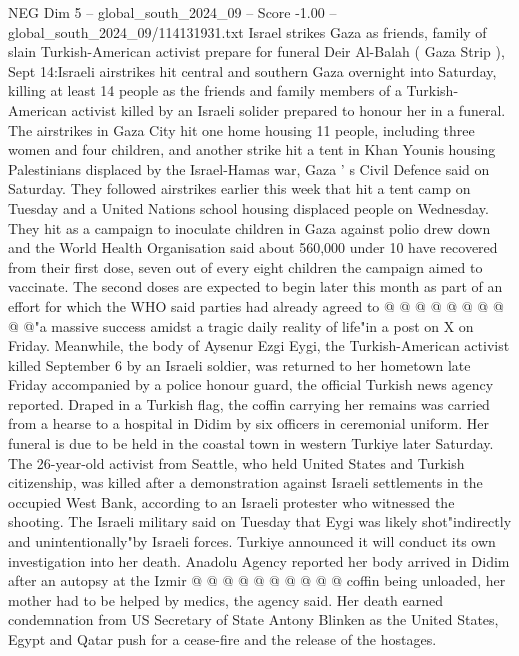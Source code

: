 \begin{textsample}{NEG Dim 5 – global\_south\_2024\_09 – Score -1.00 – global\_south\_2024\_09/114131931.txt}  \label{ex:f5_neg_194}
Israel strikes Gaza as friends, family of slain Turkish-American activist prepare for funeral Deir Al-Balah ( Gaza Strip ), Sept 14:Israeli airstrikes hit central and southern Gaza overnight into Saturday, killing at least 14 people as the friends and family members of a Turkish-American activist killed by an Israeli solider prepared to honour her in a funeral.
The airstrikes in Gaza City hit one home housing 11 people, including three women and four children, and another strike hit a tent in Khan Younis housing Palestinians displaced by the Israel-Hamas war, Gaza ' s Civil Defence said on Saturday.
They followed airstrikes earlier this week that hit a tent camp on Tuesday and a United Nations school housing displaced people on Wednesday.
They hit as a campaign to inoculate children in Gaza against polio drew down and the World Health Organisation said about 560,000 under 10 have recovered from their first dose, seven out of every eight children the campaign aimed to vaccinate.
The second doses are expected to begin later this month as part of an effort for which the WHO said parties had already agreed to @ @ @ @ @ @ @ @ @ @"a massive success amidst a tragic daily reality of life"in a post on X on Friday.
Meanwhile, the body of Aysenur Ezgi Eygi, the Turkish-American activist killed September 6 by an Israeli soldier, was returned to her hometown late Friday accompanied by a police honour guard, the official Turkish news agency reported.
Draped in a Turkish flag, the coffin carrying her remains was carried from a hearse to a hospital in Didim by six officers in ceremonial uniform.
Her funeral is due to be held in the coastal town in western Turkiye later Saturday.
The 26-year-old activist from Seattle, who held United States and Turkish citizenship, was killed after a demonstration against Israeli settlements in the occupied West Bank, according to an Israeli protester who witnessed the shooting.
The Israeli military said on Tuesday that Eygi was likely shot"indirectly and unintentionally"by Israeli forces.
Turkiye announced it will conduct its own investigation into her death.
Anadolu Agency reported her body arrived in Didim after an autopsy at the Izmir @ @ @ @ @ @ @ @ @ @ coffin being unloaded, her mother had to be helped by medics, the agency said.
Her death earned condemnation from US Secretary of State Antony Blinken as the United States, Egypt and Qatar push for a cease-fire and the release of the hostages.

\end{textsample}
